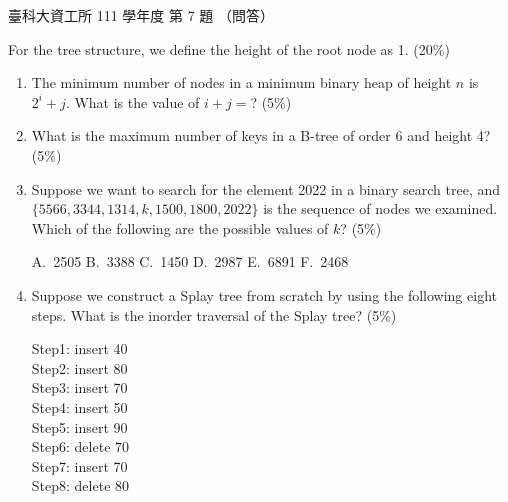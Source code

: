 \begin{pastexam}[label={px:ntust-111-ice-07}]{臺科大資工所 111 學年度 第 7 題}
（問答）

For the tree structure, we define the height of the root node as 1. (20\%)
\begin{enumerate}[label=(\arabic*)]
\item The minimum number of nodes in a minimum binary heap of height $n$ is $2^i+j$. What is the value
of $i+j=$? (5\%)
\item What is the maximum number of keys in a B-tree of order 6 and height 4? (5\%)
\item Suppose we want to search for the element 2022 in a binary search tree, and
$\{5566,3344,1314,k,1500,1800,2022\}$ is the sequence of nodes we examined. Which of the following
are the possible values of $k$? (5\%)

A.~2505 \qquad B.~3388 \qquad C.~1450 \qquad D.~2987 \qquad E.~6891 \qquad F.~2468
\item Suppose we construct a Splay tree from scratch by using the following eight steps. What is the
inorder traversal of the Splay tree? (5\%)

Step1: insert 40\\
Step2: insert 80\\
Step3: insert 70\\
Step4: insert 50\\
Step5: insert 90\\
Step6: delete 70\\
Step7: insert 70\\
Step8: delete 80
\end{enumerate}
\end{pastexam}

